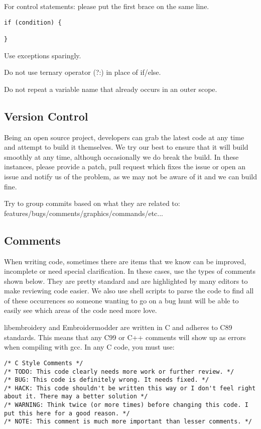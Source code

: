 For control statements: please put the first brace on the same line.

\begin{verbatim}
if (condition) {

}
\end{verbatim}

Use exceptions sparingly.

Do not use ternary operator (?:) in place of if/else.

Do not repeat a variable name that already occurs in an outer scope.

\subsection{Version Control}

Being an open source project, developers can grab the latest code at any
time and attempt to build it themselves. We try our best to ensure that
it will build smoothly at any time, although occasionally we do break
the build. In these instances, please provide a patch, pull request
which fixes the issue or open an issue and notify us of the problem, as
we may not be aware of it and we can build fine.

Try to group commits based on what they are related to:
features/bugs/comments/graphics/commands/etc...

\subsection{Comments}

When writing code, sometimes there are items that we know can be
improved, incomplete or need special clarification. In these cases, use
the types of comments shown below. They are pretty standard and are
highlighted by many editors to make reviewing code easier. We also use
shell scripts to parse the code to find all of these occurrences so
someone wanting to go on a bug hunt will be able to easily see which
areas of the code need more love.

libembroidery and Embroidermodder are written in C and adheres to C89 standards. This means
that any C99 or C++ comments will show up as errors when compiling with
gcc. In any C code, you must use:

\begin{lstlisting}
/* C Style Comments */
/* TODO: This code clearly needs more work or further review. */
/* BUG: This code is definitely wrong. It needs fixed. */
/* HACK: This code shouldn't be written this way or I don't feel right about it. There may a better solution */
/* WARNING: Think twice (or more times) before changing this code. I put this here for a good reason. */
/* NOTE: This comment is much more important than lesser comments. */
\end{lstlisting}

